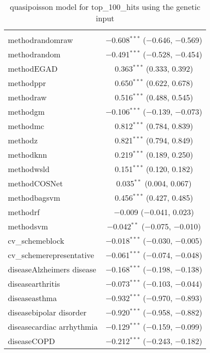 
\begin{table}[!htbp] \centering 
  \caption{quasipoisson model for top_100_hits using the genetic input} 
  \label{} 
\begin{tabular}{@{\extracolsep{5pt}}lc} 
\\[-1.8ex]\hline 
\hline \\[-1.8ex] 
 methodrandomraw & $-$0.608$^{***}$ ($-$0.646, $-$0.569) \\ 
  methodrandom & $-$0.491$^{***}$ ($-$0.528, $-$0.454) \\ 
  methodEGAD & 0.363$^{***}$ (0.333, 0.392) \\ 
  methodppr & 0.650$^{***}$ (0.622, 0.678) \\ 
  methodraw & 0.516$^{***}$ (0.488, 0.545) \\ 
  methodgm & $-$0.106$^{***}$ ($-$0.139, $-$0.073) \\ 
  methodmc & 0.812$^{***}$ (0.784, 0.839) \\ 
  methodz & 0.821$^{***}$ (0.794, 0.849) \\ 
  methodknn & 0.219$^{***}$ (0.189, 0.250) \\ 
  methodwsld & 0.151$^{***}$ (0.120, 0.182) \\ 
  methodCOSNet & 0.035$^{**}$ (0.004, 0.067) \\ 
  methodbagsvm & 0.456$^{***}$ (0.427, 0.485) \\ 
  methodrf & $-$0.009 ($-$0.041, 0.023) \\ 
  methodsvm & $-$0.042$^{**}$ ($-$0.075, $-$0.010) \\ 
  cv\_schemeblock & $-$0.018$^{***}$ ($-$0.030, $-$0.005) \\ 
  cv\_schemerepresentative & $-$0.061$^{***}$ ($-$0.074, $-$0.048) \\ 
  diseaseAlzheimers disease & $-$0.168$^{***}$ ($-$0.198, $-$0.138) \\ 
  diseasearthritis & $-$0.073$^{***}$ ($-$0.103, $-$0.044) \\ 
  diseaseasthma & $-$0.932$^{***}$ ($-$0.970, $-$0.893) \\ 
  diseasebipolar disorder & $-$0.920$^{***}$ ($-$0.958, $-$0.882) \\ 
  diseasecardiac arrhythmia & $-$0.129$^{***}$ ($-$0.159, $-$0.099) \\ 
  diseaseCOPD & $-$0.212$^{***}$ ($-$0.243, $-$0.182) \\ 

\end{tabular}
\end{table}
